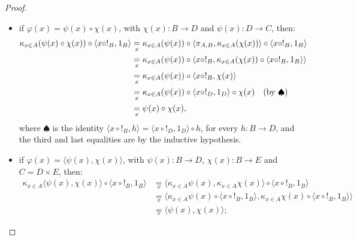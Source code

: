 \begin{proof}
\begin{itemize}
\begin{itemize}
\begin{align*}
            \end{align*}
            \item if $\varphi(x) = \psi(x) \circ \chi(x)$, with $\chi(x) : B \to D$ and $\psi(x) : D \to C$, then:
            \begin{align*}
                \kappa_{x \in A}(\psi(x) \circ \chi(x)) \circ \langle x \circ !_B, 1_B\rangle &\underset{x}{=} \kappa_{x \in A}(\psi(x)) \circ \langle \pi_{A,B}, \kappa_{x \in A}(\chi(x))\rangle \circ \langle x \circ !_B, 1_B\rangle \\
                                                                                              &\underset{x}{=} \kappa_{x \in A}(\psi(x)) \circ \langle x \circ !_B, \kappa_{x \in A}(\chi(x)) \circ \langle x \circ !_B, 1_B\rangle \rangle \\
                                                                                              &\underset{x}{=} \kappa_{x \in A}(\psi(x)) \circ \langle x \circ !_B, \chi(x)\rangle \\
                                                                                              &\underset{x}{=} \kappa_{x \in A}(\psi(x)) \circ \langle x \circ !_D, 1_D\rangle \circ \chi(x) \quad(\textnormal{by $\spadesuit$})\\
                                                                                              &\underset{x}{=} \psi(x) \circ \chi(x),
            \end{align*}
            where $\spadesuit$ is the identity $\langle x \circ !_B, h \rangle = \langle x \circ !_D, 1_D\rangle \circ h$, for every $h : B \to D$, and the third and last equalities are by the inductive hypothesis.
            \item if $\varphi(x) = \langle \psi(x), \chi(x)\rangle$, with $\psi(x) : B \to D$, $\chi(x) : B \to E$ and $C = D \times E$, then:
            \begin{align*}
                \kappa_{x \in A}\langle \psi(x), \chi(x)\rangle \circ \langle x \circ !_B, 1_B\rangle &\underset{x}{=} \langle \kappa_{x \in A}\psi(x), \kappa_{x \in A}\chi(x)\rangle \circ \langle x \circ !_B, 1_B\rangle \\
                                                                                                      &\underset{x}{=} \langle \kappa_{x \in A}\psi(x) \circ \langle x \circ !_B, 1_B\rangle, \kappa_{x \in A}\chi(x) \circ \langle x \circ !_B, 1_B\rangle\rangle \\
                                                                                                      &\underset{x}{=} \langle \psi(x),\chi(x)\rangle;

\end{align*}
\end{itemize}
\end{itemize}
\end{proof}
